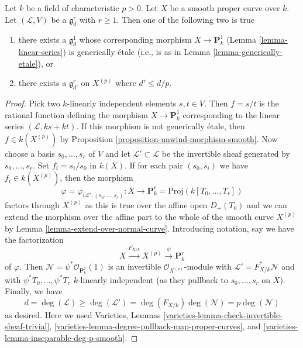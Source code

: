 \begin{lemma}
\label{lemma-inseparable-linear-system}
Let $k$ be a field of characteristic $p > 0$. Let $X$ be a smooth proper
curve over $k$. Let $(\mathcal{L}, V)$ be a $\mathfrak g^r_d$ with $r \geq 1$.
Then one of the following two is true
\begin{enumerate}
\item there exists a $\mathfrak g^1_d$ whose corresponding morphism
$X \to \mathbf{P}^1_k$ (Lemma \ref{lemma-linear-series})
is generically \'etale (i.e., is as in Lemma \ref{lemma-generically-etale}), or
\item there exists a $\mathfrak g^r_{d'}$ on $X^{(p)}$ where
$d' \leq d/p$.
\end{enumerate}
\end{lemma}

\begin{proof}
Pick two $k$-linearly independent elements $s, t \in V$.
Then $f = s/t$ is the rational function defining the morphism
$X \to \mathbf{P}^1_k$ corresponding to the linear series
$(\mathcal{L}, ks + kt)$. If this morphism is not
generically \'etale, then $f \in k(X^{(p)})$ by
Proposition \ref{proposition-unwind-morphism-smooth}.
Now choose a basis $s_0, \ldots, s_r$ of $V$ and let
$\mathcal{L}' \subset \mathcal{L}$ be the invertible sheaf
generated by $s_0, \ldots, s_r$. Set $f_i = s_i/s_0$ in $k(X)$.
If for each pair $(s_0, s_i)$ we have $f_i \in k(X^{(p)})$, then
the morphism
$$
\varphi = \varphi_{(\mathcal{L}', (s_0, \ldots, s_r)} :
X
\longrightarrow
\mathbf{P}^r_k = \text{Proj}(k[T_0, \ldots, T_r])
$$
factors through $X^{(p)}$ as this is true over the affine open
$D_+(T_0)$ and we can extend the morphism over the affine part
to the whole of the smooth curve $X^{(p)}$ by
Lemma \ref{lemma-extend-over-normal-curve}.
Introducing notation, say we have the factorization
$$
X \xrightarrow{F_{X/k}} X^{(p)} \xrightarrow{\psi} \mathbf{P}^r_k
$$
of $\varphi$. Then $\mathcal{N} = \psi^*\mathcal{O}_{\mathbf{P}^1_k}(1)$
is an invertible $\mathcal{O}_{X^{(p)}}$-module with
$\mathcal{L}' = F_{X/k}^*\mathcal{N}$ and with
$\psi^*T_0, \ldots, \psi^*T_r$ $k$-linearly independent
(as they pullback to $s_0, \ldots, s_r$ on $X$).
Finally, we have
$$
d = \deg(\mathcal{L}) \geq \deg(\mathcal{L}') =
\deg(F_{X/k}) \deg(\mathcal{N}) = p \deg(\mathcal{N})
$$
as desired. Here we used Varieties, Lemmas
\ref{varieties-lemma-check-invertible-sheaf-trivial},
\ref{varieties-lemma-degree-pullback-map-proper-curves}, and
\ref{varieties-lemma-inseparable-deg-p-smooth}.
\end{proof}

